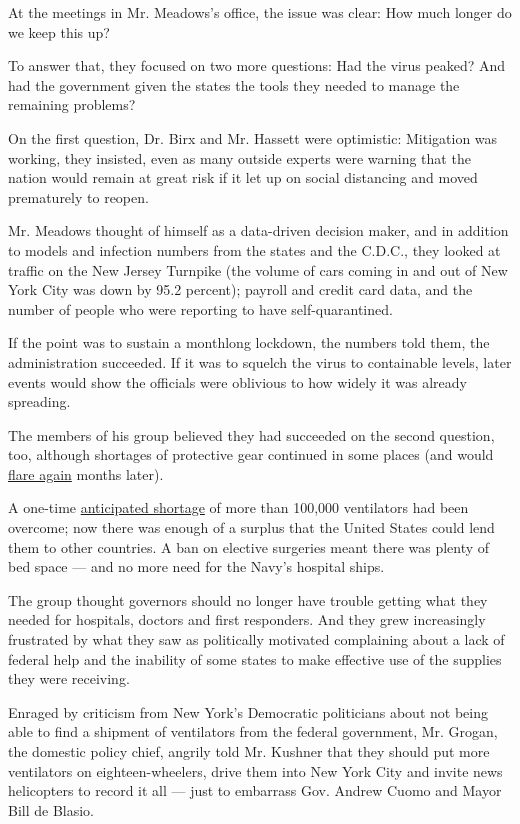At the meetings in Mr. Meadows's office, the issue was clear: How much
longer do we keep this up?

To answer that, they focused on two more questions: Had the virus
peaked? And had the government given the states the tools they needed to
manage the remaining problems?

On the first question, Dr. Birx and Mr. Hassett were optimistic:
Mitigation was working, they insisted, even as many outside experts were
warning that the nation would remain at great risk if it let up on
social distancing and moved prematurely to reopen.

Mr. Meadows thought of himself as a data-driven decision maker, and in
addition to models and infection numbers from the states and the C.D.C.,
they looked at traffic on the New Jersey Turnpike (the volume of cars
coming in and out of New York City was down by 95.2 percent); payroll
and credit card data, and the number of people who were reporting to
have self-quarantined.

If the point was to sustain a monthlong lockdown, the numbers told them,
the administration succeeded. If it was to squelch the virus to
containable levels, later events would show the officials were oblivious
to how widely it was already spreading.

The members of his group believed they had succeeded on the second
question, too, although shortages of protective gear continued in some
places (and would
\href{https://www.nytimes.com/2020/07/08/health/coronavirus-masks-ppe-doc.html}{flare
again} months later).

A one-time
\href{https://www.whitehouse.gov/briefings-statements/remarks-president-trump-vice-president-pence-members-coronavirus-task-force-press-briefing-13/}{anticipated
shortage} of more than 100,000 ventilators had been overcome; now there
was enough of a surplus that the United States could lend them to other
countries. A ban on elective surgeries meant there was plenty of bed
space --- and no more need for the Navy's hospital ships.

The group thought governors should no longer have trouble getting what
they needed for hospitals, doctors and first responders. And they grew
increasingly frustrated by what they saw as politically motivated
complaining about a lack of federal help and the inability of some
states to make effective use of the supplies they were receiving.

Enraged by criticism from New York's Democratic politicians about not
being able to find a shipment of ventilators from the federal
government, Mr. Grogan, the domestic policy chief, angrily told Mr.
Kushner that they should put more ventilators on eighteen-wheelers,
drive them into New York City and invite news helicopters to record it
all --- just to embarrass Gov. Andrew Cuomo and Mayor Bill de Blasio.

